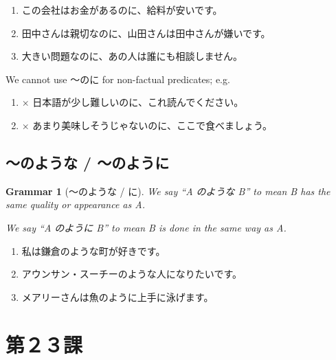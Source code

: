 \documentclass[notoc,notitlepage]{tufte-book}
\newtheorem{grammar}{\faBook Grammar}
\begin{document}
\begin{eg}
  \begin{enumerate}
    \item この会社はお金があるのに、給料が安いです。
    \item 田中さんは親切なのに、山田さんは田中さんが嫌いです。
    \item 大きい問題なのに、あの人は誰にも相談しません。
  \end{enumerate}
\end{eg}

\begin{warning}
  We cannot use 〜のに for non-factual predicates; e.g.
  \begin{enumerate}
    \item $\times$ 日本語が少し難しいのに、これ読んでください。
    \item $\times$ あまり美味しそうじゃないのに、ここで食べましょう。
  \end{enumerate}
\end{warning}


\section{〜のような / 〜のように}%
\label{sec:noyouna_noyouni}

\begin{grammar}[〜のような / に]\label{grammar:_noyouna_ni}
  We say ``A のような B'' to mean B has the same quality or appearance
  as A.

  We say ``A のように B'' to mean B is done in the same way as A.
\end{grammar}

\begin{eg}
  \begin{enumerate}
    \item 私は鎌倉のような町が好きです。
    \item アウンサン・スーチーのような人になりたいです。
    \item メアリーさんは魚のように上手に泳げます。
  \end{enumerate}
\end{eg}



\chapter{第２３課}%
\label{chp:dai_23_ka}
\end{document}
